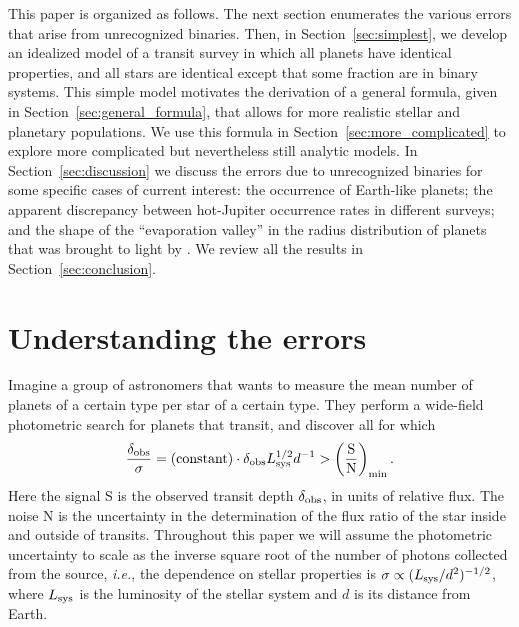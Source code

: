 \documentclass[12pt,modern]{aastex61}
\begin{document}
This paper is organized as follows.  The next section enumerates the
various errors that arise from unrecognized binaries.  Then, in 
Section~\ref{sec:simplest}, we develop an idealized model of a transit
survey in which all planets 
have identical properties, and all stars are identical
except that some fraction are in binary systems.  This simple 
model motivates the
derivation of a general formula, given in
Section~\ref{sec:general_formula}, that allows for more realistic
stellar and planetary populations.  We use this formula in
Section~\ref{sec:more_complicated} to explore more complicated but
nevertheless still analytic models.  In Section~\ref{sec:discussion}
we discuss the errors due to unrecognized binaries for some specific
cases of current interest: the occurrence of Earth-like planets; the
apparent discrepancy between hot-Jupiter occurrence rates in different
surveys; and the shape of the ``evaporation valley'' in the radius
distribution of planets that was brought to light by
\citet{fulton_california-_2017}.  We review all the results in
Section~\ref{sec:conclusion}.


\section{Understanding the errors}
\label{sec:concept}

Imagine a group of astronomers that wants to measure the mean number of
planets of a certain type per star of a certain type.  They perform a
wide-field photometric search for planets that transit, and discover
all for which
\begin{equation}
\frac{\delta_{\rm obs}}{\sigma}
  = ({\rm constant}) \cdot \delta_{\rm obs} L_{\rm sys}^{1/2} d^{-1}
> \left(\frac{{\rm S}}{{\rm N}}\right)_{\rm min}.
\label{eq:S_N_thresh}
\end{equation}
Here the signal S is the observed transit depth $\delta_{\rm obs}$, in
units of relative flux.
The noise N is the uncertainty in the
determination of the flux ratio of the star inside and outside of
transits.  Throughout this paper we will assume the photometric
uncertainty to scale as the inverse square root of the number of
photons collected from the source, {\it i.e.}, the dependence on
stellar properties is $\sigma \propto (L_{\rm sys}/d^2)^{-1/2}$, where
$L_{\rm sys}$ is the luminosity of the stellar system and $d$ is its
distance from Earth.
\end{document}
